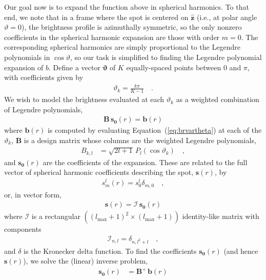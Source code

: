 \documentclass[modern]{aastex62}
\begin{document}
Our goal now is to expand the function above in spherical harmonics. To that end,
we note that in a frame where the spot is centered on $\hat{\mathbf{z}}$
(i.e., at polar angle $\vartheta = 0$), the brightness profile is azimuthally
symmetric, so the only nonzero coefficients in the spherical harmonic
expansion are those with order $m = 0$. The corresponding spherical harmonics are
simply proportional to the Legendre polynomials in $\cos\vartheta$, so our task is
simplified to finding the Legendre polynomial expansion of $b$.
Define a vector $\pmb{\vartheta}$ of $K$ equally-spaced points
between $0$ and $\pi$, with coefficients given by
%
\begin{align}
    \vartheta_k = \frac{k\pi}{K-1}
    \quad.
\end{align}
%
We wish to model the brightness evaluated at each $\vartheta_k$
as a weighted combination of Legendre polynomials,
%
\begin{align}
    \mathbf{B} \, \mathbf{s_0}(r) = \mathbf{b}(r)
\end{align}
%
%
where $\mathbf{b}(r)$ is computed by evaluating Equation~(\ref{eq:brvartheta})
at each of the $\vartheta_k$,
$\mathbf{B}$ is a design matrix whose columns are
the weighted Legendre polynomials,
%
\begin{align}
    B_{k,l} & = \sqrt{2l + 1} \, P_l\left( \cos \vartheta_k \right)
    \quad,
\end{align}
%
and $\mathbf{s_0}(r)$ are the coefficients of the expansion.
These are related to the full vector of spherical harmonic coefficients describing
the spot, $\mathbf{s}(r)$, by
%
\begin{align}
    s^l_m(r) = s^l_0 \delta_{m,0}
    \quad,
\end{align}
%
or, in vector form,
%
\begin{align}
    \label{eq:sofr}
    \mathbf{s}(r) = \pmb{\mathcal{I}} \, \mathbf{s_0}(r)
\end{align}
%
where $\pmb{\mathcal{I}}$ is a rectangular
$\left( \left(l_\mathrm{max} + 1\right)^2 \times \left(l_\mathrm{max} + 1\right) \right)$
identity-like matrix with components
%
\begin{align}
    \mathcal{I}_{n, l} = \delta_{n, l^2 + l}
    \quad,
\end{align}
%
and $\delta$ is the Kronecker delta function.
To find the coefficients $\mathbf{s_0}(r)$
(and hence $\mathbf{s}(r)$), we solve the (linear) inverse problem,
%
\begin{align}
    \mathbf{s_0}(r) & = \mathbf{B}^+ \, \mathbf{b}(r)
\end{align}
\end{document}
